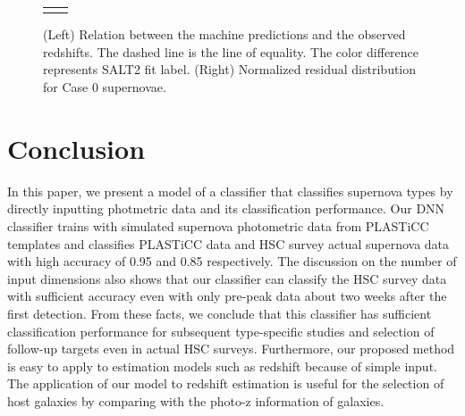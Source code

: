 \documentclass[useamsfonts]{pasj01}
\begin{document}
\begin{figure}[ht]
\begin{tabular}{cc}
\begin{minipage}{0.5\hsize}
\begin{center}
            \end{center}
        \end{minipage}
    \end{tabular}  \caption{%
    (Left) Relation between the machine predictions and the observed redshifts.
    The dashed line is the line of equality.
    The color difference represents SALT2 fit label.
    (Right) Normalized residual distribution for Case 0 supernovae.
    }%
    \label{fig:redshift_estimation}
\end{figure}
%
%
%
\section{Conclusion}
%
In this paper, we present a model of a classifier that classifies supernova types by directly inputting photmetric data and its classification performance.
Our DNN classifier trains with simulated supernova photometric data from PLASTiCC templates and classifies PLASTiCC data and HSC survey actual supernova data with high accuracy of 0.95 and 0.85 respectively.
The discussion on the number of input dimensions also shows that our classifier can classify the HSC survey data with sufficient accuracy even with only pre-peak data about two weeks after the first detection.
From these facts, we conclude that this classifier has sufficient classification performance for subsequent type-specific studies and selection of follow-up targets even in actual HSC surveys.
Furthermore, our proposed method is easy to apply to estimation models such as redshift because of simple input. The application of our model to redshift estimation is useful for the selection of host galaxies by comparing with the photo-z information of galaxies.
%
\end{document}
